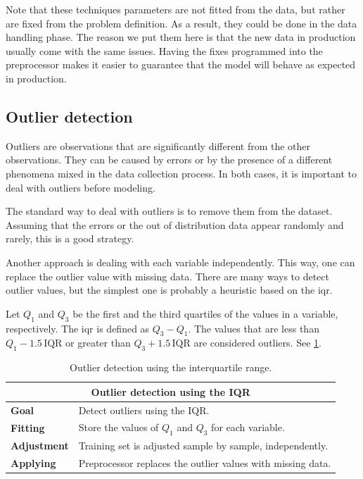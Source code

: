Note that these techniques parameters are not fitted from the data, but rather are fixed
from the problem definition.  As a result, they could be done in the data handling phase.
The reason we put them here is that the new data in production usually come with the
same issues.  Having the fixes programmed into the preprocessor makes it easier to
guarantee that the model will behave as expected in production.

\subsection{Outlier detection}

Outliers are observations that are significantly different from the other observations.
They can be caused by errors or by the presence of a different phenomena mixed in the data
collection process.  In both cases, it is important to deal with outliers before modeling.

The standard way to deal with outliers is to remove them from the dataset.  Assuming that
the errors or the out of distribution data appear randomly and rarely, this is a good
strategy.

Another approach is dealing with each variable independently.  This way, one can replace
the outlier value with missing data.  There are many ways to detect outlier values, but
the simplest one is probably a heuristic based on the \gls{iqr}.

Let $Q_1$ and $Q_3$ be the first and the third quartiles of the values in a variable,
respectively.  The \gls{iqr} is defined as $Q_3 - Q_1$.  The values that are less than
$Q_1 - 1.5\, \text{IQR}$ or greater than $Q_3 + 1.5\, \text{IQR}$ are considered outliers.
See \cref{tab:iqr-outlier}.

\begin{table}\caption{Outlier detection using the interquartile range.}
  \centering
  \begin{tabular}{lp{6cm}}
    \toprule
    \multicolumn{2}{c}{\textbf{Outlier detection using the IQR}} \\
    \midrule
    \textbf{Goal} &
      Detect outliers using the IQR. \\
    \textbf{Fitting} &
      Store the values of $Q_1$ and $Q_3$ for each variable. \\
    \textbf{Adjustment} &
      Training set is adjusted sample by sample, independently. \\
    \textbf{Applying} &
      Preprocessor replaces the outlier values with missing data. \\
    \bottomrule
  \end{tabular}
  \label{tab:iqr-outlier}
\end{table}

